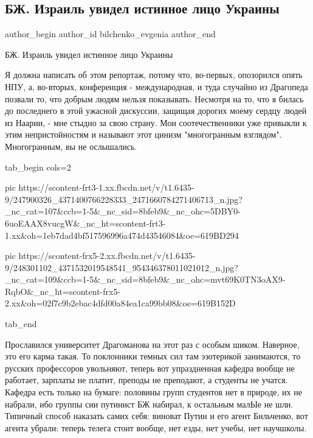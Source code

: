  
 
 
 
 
 
\subsection{БЖ. Израиль увидел истинное лицо Украины}
\label{sec:23_10_2021.fb.bilchenko_evgenia.4.izrail_lico_ukraincy}
 
\ifcmt
 author_begin
   author_id bilchenko_evgenia
 author_end
\fi

БЖ. Израиль увидел истинное лицо Украины

Я должна написать об этом репортаж, потому что, во-первых, опозорился опять
НПУ, а, во-вторых, конференция - международная, и туда случайно из Драгопеда
позвали то, что добрым людям нельзя показывать. Несмотря на то, что я билась до
последнего в этой ужасной дискуссии, защищая дорогих моему сердцу людей из
Наарии, - мне стыдно за свою страну. Мои соотечественники уже привыкли к этим
непристойностям и называют этот цинизм "многогранным взглядом". Многогранным,
вы не ослышались.

\ifcmt
tab_begin cols=2

  pic https://scontent-frt3-1.xx.fbcdn.net/v/t1.6435-9/247900326_4371400766228333_2471660784271406713_n.jpg?_nc_cat=107&ccb=1-5&_nc_sid=8bfeb9&_nc_ohc=5DBY0-6uoEAAX8vucgW&_nc_ht=scontent-frt3-1.xx&oh=1eb7dad4bf517596996a474d43546084&oe=619BD294

  pic https://scontent-frx5-2.xx.fbcdn.net/v/t1.6435-9/248301102_4371532019548541_954346378011021012_n.jpg?_nc_cat=109&ccb=1-5&_nc_sid=8bfeb9&_nc_ohc=mvt69K0TN3oAX9-RqbO&_nc_ht=scontent-frx5-2.xx&oh=02f7c9b2ebac4dfd00a84ea1ca99bb08&oe=619B152D

tab_end
\fi

Прославился университет Драгоманова на этот раз с особым шиком. Наверное, это
его карма такая. То поклонники темных сил там эзотерикой занимаются, то русских
профессоров увольняют, теперь вот упраздненная кафедра вообще не работает,
зарплаты не платит, преподы не преподают, а студенты не учатся. Кафедра есть
только на бумаге: половины групп студентов нет в природе, их не набрали, ибо
группы сии путинист БЖ набирал, к остальным малЫе не шли. Типичный способ
наказать самих себя: виноват Путин и его агент Бильченко, вот агента убрали:
теперь телега стоит вообще, нет езды, нет учебы, нет научшколы.

